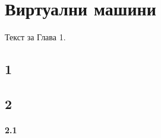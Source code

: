 \chapter{Виртуални машини}\label{Sect1}
Текст за Глава 1.
\section{1}
\section{2}
\subsubsection{2.1}